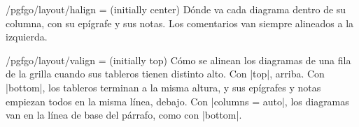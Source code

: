 \begin{key}{/pgfgo/layout/halign =  (initially center)}
	Dónde va cada diagrama dentro de su columna, con su epígrafe y sus notas. Los comentarios van siempre alineados a la izquierda.

	\begin{codeexample}
	\end{codeexample}

\end{key}

\begin{key}{/pgfgo/layout/valign =  (initially top)}
	Cómo se alinean los diagramas de una fila de la grilla cuando sus tableros tienen distinto alto. Con |top|, arriba. Con |bottom|, los tableros terminan a la misma altura, y sus epígrafes y notas empiezan todos en la misma línea, debajo. Con |columns = auto|, los diagramas van en la línea de base del párrafo, como con |bottom|.

	\begin{codeexample}
		\begin{pgfgolayout}[columns = 3, valign = bottom]
			\begin{goban}[5, scale = 0.6]\end{goban}
			\begin{goban}[5x3, scale = 0.6]\end{goban}
			\begin{goban}[9, scale = 0.6]\end{goban}
		\end{pgfgolayout}
	\end{codeexample}

	\begin{pgfgolayout}[columns = 3, valign = bottom]
		\begin{goban}[5, scale = 0.6]\end{goban}
		\begin{goban}[5x3, scale = 0.6]\end{goban}
		\begin{goban}[9, scale = 0.6]\end{goban}
	\end{pgfgolayout}
\end{key}


